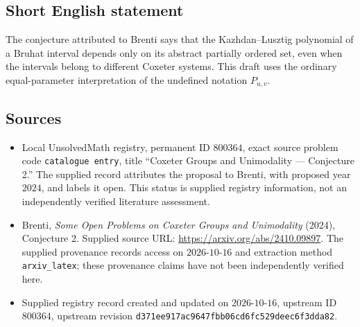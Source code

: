 \documentclass[11pt]{article}
\begin{document}
\subsection{Short English statement}
The conjecture attributed to Brenti says that the Kazhdan--Lusztig polynomial of a Bruhat interval depends only on its abstract partially ordered set, even when the intervals belong to different Coxeter systems. This draft uses the ordinary equal-parameter interpretation of the undefined notation \(P_{u,v}\).
\subsection{Sources}
\begin{itemize}
\item Local UnsolvedMath registry, permanent ID \(800364\), exact source problem code \texttt{catalogue entry}, title ``Coxeter Groups and Unimodality --- Conjecture 2.'' The supplied record attributes the proposal to Brenti, with proposed year \(2024\), and labels it open. This status is supplied registry information, not an independently verified literature assessment.
\item Brenti, \emph{Some Open Problems on Coxeter Groups and Unimodality} (2024), Conjecture 2. Supplied source URL: \url{https://arxiv.org/abs/2410.09897}. The supplied provenance records access on \(2026\text{-}10\text{-}16\) and extraction method \texttt{arxiv\_latex}; these provenance claims have not been independently verified here.
\item Supplied registry record created and updated on \(2026\text{-}10\text{-}16\), upstream ID \(800364\), upstream revision \texttt{d371ee917ac9647fbb06cd6fc529deec6f3dda82}.
\end{itemize}
\end{document}

